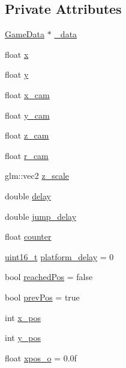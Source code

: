 \subsection*{Private Attributes}
\begin{DoxyCompactItemize}
\item 
\hyperlink{structGameData}{Game\+Data} $\ast$ \hyperlink{classGamePlayState_a0e1217ba99e0bb8098e73ebaa99bdc77}{\+\_\+data}
\item 
float \hyperlink{classGamePlayState_a055feaf3b4acaaff53dddc571252c4e4}{x}
\item 
float \hyperlink{classGamePlayState_ae1da324a3664591e663d09a5b17f9007}{y}
\item 
float \hyperlink{classGamePlayState_a1f0c5c88f94177891ec0819628d0aa8c}{x\+\_\+cam}
\item 
float \hyperlink{classGamePlayState_ab69b90dcdbb3375687e6e3641d1654da}{y\+\_\+cam}
\item 
float \hyperlink{classGamePlayState_a3b25b85d41324ec556fe81a75bb1811f}{z\+\_\+cam}
\item 
float \hyperlink{classGamePlayState_a430ff4098f9f58fe0b6ab4fe154a89a0}{r\+\_\+cam}
\item 
glm\+::vec2 \hyperlink{classGamePlayState_a9bdc2e5899e9ca4e266019f646d2ba34}{z\+\_\+scale}
\item 
double \hyperlink{classGamePlayState_a28703a4a41c15f3957f76f8ffcdad4f3}{delay}
\item 
double \hyperlink{classGamePlayState_a4a4caf8b02f0dbac194c18947bf84ba6}{jump\+\_\+delay}
\item 
float \hyperlink{classGamePlayState_a739fbcc19589d3b2218664832fd864fe}{counter}
\item 
\hyperlink{stdint_8h_a273cf69d639a59973b6019625df33e30}{uint16\+\_\+t} \hyperlink{classGamePlayState_ae6d97fab3b6d39625b5ce3d124183c56}{platform\+\_\+delay} = 0
\item 
bool \hyperlink{classGamePlayState_ae17620bd80a3c92dea5bdbde326535ea}{reached\+Pos} = false
\item 
bool \hyperlink{classGamePlayState_a0b574d8b2807e3229e51ec16bc5b74a6}{prev\+Pos} = true
\item 
int \hyperlink{classGamePlayState_a911170373ef52829b49f5466dcfbc539}{x\+\_\+pos}
\item 
int \hyperlink{classGamePlayState_a9b95e9647ae9faa2999c0493eed9eca8}{y\+\_\+pos}
\item 
float \hyperlink{classGamePlayState_a7c1580fcdce88e288e301045fe591c20}{xpos\+\_\+o} = 0.\+0f
\item 

\end{DoxyCompactItemize}
